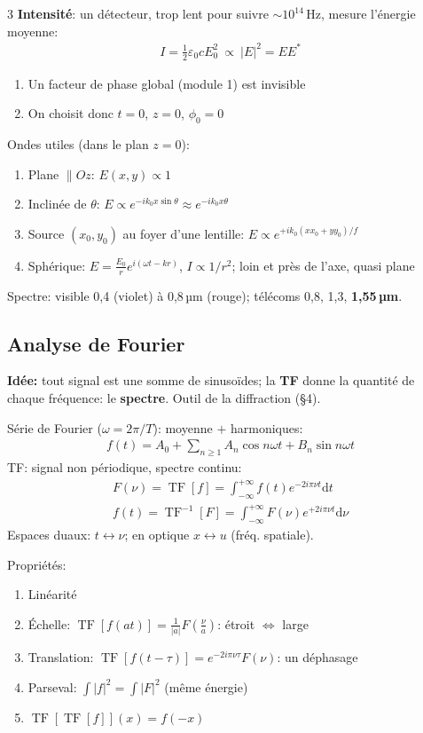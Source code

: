 \documentclass[12pt, a4paper]{article}
\newcommand{\TF}{\operatorname{TF}}
\newcommand{\dd}{\mathrm{d}}
\begin{document}
\begin{multicols*}{3}
	\textbf{Intensité}: un détecteur, trop lent pour suivre $\sim10^{14}$\,Hz, mesure l'énergie moyenne:
	\begin{gather*}
		I=\tfrac12\varepsilon_0cE_0^2\ \propto\ |E|^2=EE^*
	\end{gather*}
	\begin{enumerate}[\roman*.]
		\item Un facteur de phase global (module 1) est invisible
		\item On choisit donc $t=0$, $z=0$, $\phi_0=0$
	\end{enumerate}

	Ondes utiles (dans le plan $z=0$):
	\begin{enumerate}[\roman*.]
		\item Plane $\parallel Oz$: $E(x,y)\propto1$
		\item Inclinée de $\theta$: $E\propto e^{-ik_0x\sin\theta}\approx e^{-ik_0x\theta}$
		\item Source $(x_0,y_0)$ au foyer d'une lentille: $E\propto e^{+ik_0(xx_0+yy_0)/f}$
		\item Sphérique: $E=\frac{E_0}{r}e^{i(\omega t-kr)}$, $I\propto1/r^2$; loin et près de l'axe, quasi plane
	\end{enumerate}
	Spectre: visible 0,4 (violet) à 0,8\,µm (rouge); télécoms 0,8, 1,3, \textbf{1,55\,µm}.

	\subsection{Analyse de Fourier}
	\textbf{Idée:} tout signal est une somme de sinusoïdes; la \textbf{TF} donne la quantité de chaque fréquence: le \textbf{spectre}. Outil de la diffraction (§4).

	Série de Fourier ($\omega=2\pi/T$): moyenne $+$ harmoniques:
	\begin{gather*}
		f(t)=A_0+\sum_{n\geq1}A_n\cos n\omega t+B_n\sin n\omega t
	\end{gather*}
	TF: signal non périodique, spectre continu:
	\begin{gather*}
		F(\nu)=\TF[f]=\int_{-\infty}^{+\infty}f(t)e^{-2i\pi\nu t}\dd t\\
		f(t)=\TF^{-1}[F]=\int_{-\infty}^{+\infty}F(\nu)e^{+2i\pi\nu t}\dd\nu
	\end{gather*}
	Espaces duaux: $t\leftrightarrow\nu$; en optique $x\leftrightarrow u$ (fréq. spatiale).

	\colbreak
	Propriétés:
	\begin{enumerate}[\roman*.]
		\item Linéarité
		\item Échelle: $\TF[f(at)]=\frac{1}{|a|}F(\frac{\nu}{a})$: étroit $\Leftrightarrow$ large
		\item Translation: $\TF[f(t-\tau)]=e^{-2i\pi\nu\tau}F(\nu)$: un déphasage
		\item Parseval: $\int|f|^2=\int|F|^2$ (même énergie)
		\item $\TF[\TF[f]](x)=f(-x)$
	\end{enumerate}


\end{multicols*}
\end{document}
